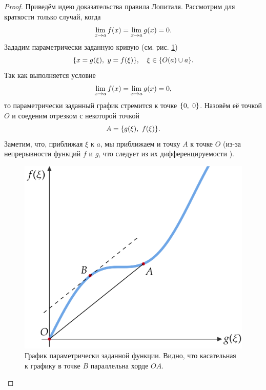 \documentclass[12pt]{article}
\begin{document}
\begin{proof}
Приведём идею доказательства правила Лопиталя. Рассмотрим для краткости только случай, когда 
\begin{equation}
    \lim_{x\rightarrow a}{f\qty(x)} = \lim_{x\rightarrow a}{g\qty(x)} = 0.
\end{equation}
Зададим параметрически заданную кривую (см. рис. \ref{fig:6})
\begin{equation}
    \qty{x = g\qty(\xi),\ y = f\qty(\xi)},\quad \xi\in \qty{O\qty(a)\cup a}.
\end{equation}
Так как выполняется условие
\begin{equation}
    \lim_{x\rightarrow a}{f\qty(x)} = \lim_{x\rightarrow a}{g\qty(x)} = 0,
\end{equation}
то параметрически заданный график стремится к точке $\qty{0,\ 0}$. Назовём её точкой $O$ и соеденим отрезком с некоторой точкой 
\begin{equation}
    A = \qty{g\qty(\xi),\ f\qty(\xi)}.
\end{equation}
Заметим, что, приближая $\xi$ к $a$, мы приближаем и точку $A$ к точке $O$ (из\--за непрерывности функций $f$ и $g$, что следует из их дифференцируемости \cite{il-poz}).
\begin{figure}
    \centering
    \includegraphics[width = 1\textwidth]{fig6.png}
    \caption{График параметрически заданной функции. Видно, что касательная к графику в точке $B$ параллельна хорде $OA$.}
    \label{fig:6}
\end{figure}
\par

\end{proof}
\end{document}
